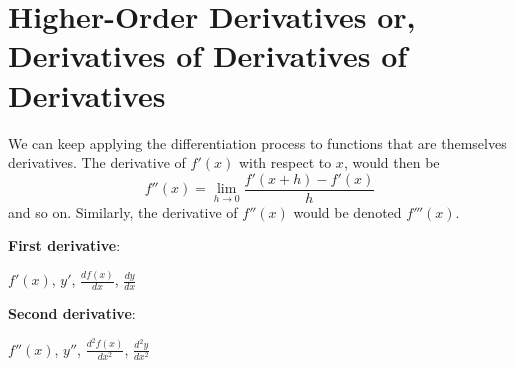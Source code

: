 \documentclass[]{book}
\theoremstyle{definition}
\theoremstyle{definition}
\theoremstyle{definition}
\theoremstyle{remark}
\begin{document}

\section{Higher-Order Derivatives or, Derivatives of Derivatives of
Derivatives}\label{higher-order-derivatives-or-derivatives-of-derivatives-of-derivatives}

We can keep applying the differentiation process to functions that are
themselves derivatives. The derivative of \(f'(x)\) with respect to
\(x\), would then be
\[f''(x)=\lim\limits_{h\to 0}\frac{f'(x+h)-f'(x)}{h}\] and so on.
Similarly, the derivative of \(f''(x)\) would be denoted \(f'''(x)\).

\parbox[t]{2in}{{\bf First derivative}:} \(f'(x)\), \(y'\),
\(\frac{df(x)}{dx}\), \(\frac{dy}{dx}\)

\parbox[t]{2in}{{\bf Second derivative}:} \(f''(x)\), \(y''\),
\(\frac{d^2f(x)}{dx^2}\), \(\frac{d^2y}{dx^2}\)
\end{document}
